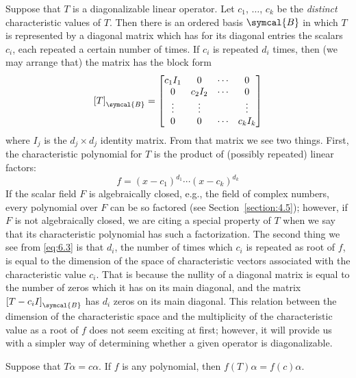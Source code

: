 Suppose that \(T\) is a diagonalizable linear operator. Let \(c_1\), \(\ldots\), \(c_k\) be the \emph{distinct} characteristic values of \(T\). Then there is an ordered basis \(\symcal{B}\) in which \(T\) is represented by a diagonal matrix which has for its diagonal entries the scalars \(c_i\), each repeated a certain number of times. If \(c_i\) is repeated \(d_i\) times, then (we may arrange that) the matrix has the block form
\begin{equation}
    \left[T\right]_{\symcal{B}}=
    \begin{bmatrix}
        c_1I_1 & 0 & \cdots & 0 \\
        0 & c_2I_2 & \cdots & 0 \\
        \vdots & \vdots && \vdots \\
        0 & 0 & \cdots & c_kI_k
    \end{bmatrix}
    \label{eq:6.3}
\end{equation}
where \(I_j\) is the \(d_j\times d_j\) identity matrix. From that matrix we see two things. First, the characteristic polynomial for \(T\) is the product of (possibly repeated) linear factors:
\begin{equation*}
    f=\left(x-c_1\right)^{d_1}\cdots\left(x-c_k\right)^{d_k}
\end{equation*}
If the scalar field \(F\) is algebraically closed, e.g., the field of complex numbers, every polynomial over \(F\) can be so factored (see Section~\ref{section:4.5}); however, if \(F\) is not algebraically closed, we are citing a special property of \(T\) when we say that its characteristic polynomial has such a factorization. The second thing we see from \eqref{eq:6.3} is that \(d_i\), the number of times which \(c_i\) is repeated as root of \(f\), is equal to the dimension of the space of characteristic vectors associated with the characteristic value \(c_i\). That is because the nullity of a diagonal matrix is equal to the number of zeros which it has on its main diagonal, and the matrix \(\left[T-c_iI\right]_{\symcal{B}}\) has \(d_i\) zeros on its main diagonal. This relation between the dimension of the characteristic space and the multiplicity of the characteristic value as a root of \(f\) does not seem exciting at first; however, it will provide us with a simpler way of determining whether a given operator is diagonalizable.

\begin{lemma}
    Suppose that \(T\alpha=c\alpha\). If \(f\) is any polynomial, then \(f\left(T\right)\alpha=f\left(c\right)\alpha\).
\end{lemma}

